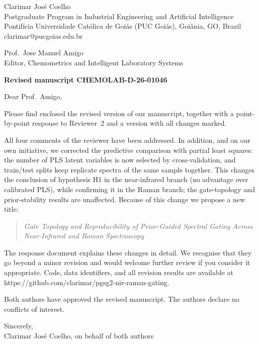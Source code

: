 \documentclass[11pt]{article}
\begin{document}
\noindent Clarimar José Coelho\\
Postgraduate Program in Industrial Engineering and Artificial Intelligence\\
Pontifícia Universidade Católica de Goiás (PUC Goiás), Goiânia, GO, Brazil\\
clarimar@pucgoias.edu.br

\medskip
\noindent Prof.\ Jose Manuel Amigo\\
Editor, Chemometrics and Intelligent Laboratory Systems

\medskip
\noindent\textbf{Revised manuscript CHEMOLAB-D-26-01046}

Dear Prof.\ Amigo,

Please find enclosed the revised version of our manuscript, together with a point-by-point response to Reviewer~2 and a version with all changes marked.

All four comments of the reviewer have been addressed. In addition, and on our own initiative, we corrected the predictive comparison with partial least squares: the number of PLS latent variables is now selected by cross-validation, and train/test splits keep replicate spectra of the same sample together. This changes the conclusion of hypothesis H1 in the near-infrared branch (no advantage over calibrated PLS), while confirming it in the Raman branch; the gate-topology and prior-stability results are unaffected. Because of this change we propose a new title:

\begin{quote}
\emph{Gate Topology and Reproducibility of Prior-Guided Spectral Gating Across Near-Infrared and Raman Spectroscopy}
\end{quote}

The response document explains these changes in detail. We recognise that they go beyond a minor revision and would welcome further review if you consider it appropriate. Code, data identifiers, and all revision results are available at https://github.com/clarimar/pgsg2-nir-raman-gating.

Both authors have approved the revised manuscript. The authors declare no conflicts of interest.

Sincerely,\\
Clarimar José Coelho, on behalf of both authors
\end{document}
